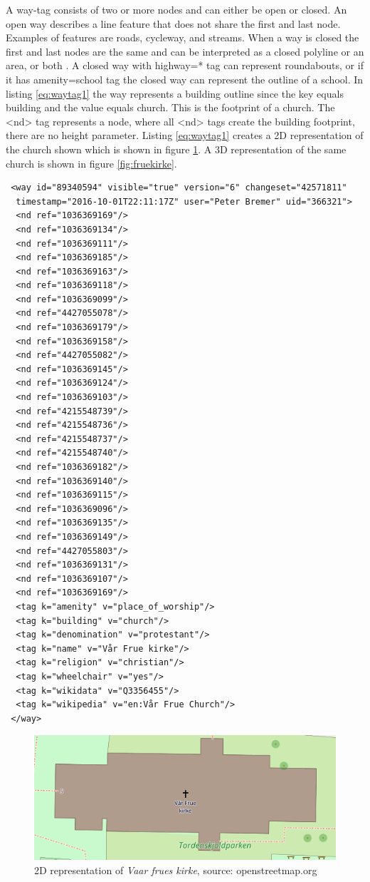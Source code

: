 A way-tag consists of two or more nodes and can either be open or closed. An open way describes a line feature that does not share the first and last node. Examples of features are roads, cycleway, and streams. When a way is closed the first and last nodes are the same and can be interpreted as a closed polyline or an area, or both \cite{OpenStreetMapd}. A closed way with highway=* tag can represent roundabouts, or if it has amenity=school tag the closed way can represent the outline of a school. In listing \ref{eq:waytag1} the way represents a building outline since the key equals building and the value equals church.  This is the footprint of a church. The <nd> tag represents a node, where all <nd> tags create the building footprint, there are no height parameter. Listing \ref{eq:waytag1} creates a 2D representation of the church shown which is shown in figure \ref{fig:fruekirke2D}. A 3D representation of the same church is shown in figure \ref{fig:fruekirke}.

\begin{lstlisting}
 <way id="89340594" visible="true" version="6" changeset="42571811" 
  timestamp="2016-10-01T22:11:17Z" user="Peter Bremer" uid="366321">
  <nd ref="1036369169"/>
  <nd ref="1036369134"/>
  <nd ref="1036369111"/>
  <nd ref="1036369185"/>
  <nd ref="1036369163"/>
  <nd ref="1036369118"/>
  <nd ref="1036369099"/>
  <nd ref="4427055078"/>
  <nd ref="1036369179"/>
  <nd ref="1036369158"/>
  <nd ref="4427055082"/>
  <nd ref="1036369145"/>
  <nd ref="1036369124"/>
  <nd ref="1036369103"/>
  <nd ref="4215548739"/>
  <nd ref="4215548736"/>
  <nd ref="4215548737"/>
  <nd ref="4215548740"/>
  <nd ref="1036369182"/>
  <nd ref="1036369140"/>
  <nd ref="1036369115"/>
  <nd ref="1036369096"/>
  <nd ref="1036369135"/>
  <nd ref="1036369149"/>
  <nd ref="4427055803"/>
  <nd ref="1036369131"/>
  <nd ref="1036369107"/>
  <nd ref="1036369169"/>
  <tag k="amenity" v="place_of_worship"/>
  <tag k="building" v="church"/>
  <tag k="denomination" v="protestant"/>
  <tag k="name" v="Vår Frue kirke"/>
  <tag k="religion" v="christian"/>
  <tag k="wheelchair" v="yes"/>
  <tag k="wikidata" v="Q3356455"/>
  <tag k="wikipedia" v="en:Vår Frue Church"/>
 </way>
\end{lstlisting}

\begin{figure}[H]
    \centering
    \includegraphics[scale=0.5]{figures/FixedByMe/fruekirke2D.png}
    \caption{2D representation of \textit{Vaar frues kirke}, source: openstreetmap.org}
    \label{fig:fruekirke2D}
\end{figure}

